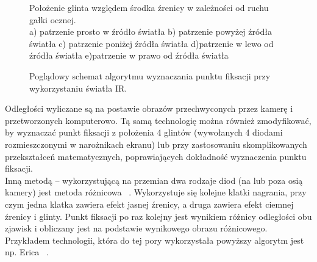 \documentclass[twoside,a4paper]{book}
\begin{document}
\begin{figure}[!h]
		\centering
		\caption{Położenie glinta względem środka źrenicy w zależności od ruchu gałki ocznej. \\
a) patrzenie prosto w źródło światła b) patrzenie powyżej źródła światła c) patrzenie poniżej źródła światła d)patrzenie w lewo od źródła światła e)patrzenie w prawo od źródła światła 
}
		\label{fig:glint}
	\end{figure}
	
\begin{figure}[!h]

		\centering		
		\caption{Poglądowy schemat algorytmu wyznaczania punktu fiksacji przy wykorzystaniu światła IR. }
		\label{fig:glintUML}
	\end{figure}
	
Odległości wyliczane są  na postawie obrazów przechwyconych  przez kamerę i przetworzonych komputerowo.  
Tą samą technologię można również zmodyfikować, by wyznaczać punkt fiksacji  z położenia 4 glintów (wywołanych 4 diodami rozmieszczonymi w narożnikach ekranu) lub przy zastosowaniu skomplikowanych  przekształceń matematycznych,  poprawiających dokładność  wyznaczenia punktu fiksacji. ~\cite{kunkaFiksacja}
\\Inną metodą – wykorzystującą  na przemian dwa rodzaje diod (na lub poza osią kamery) jest metoda różnicowa ~\cite{kunkaFiksacja}. Wykorzystuje się kolejne klatki nagrania, przy czym jedna klatka zawiera efekt jasnej źrenicy, a druga zawiera efekt ciemnej źrenicy i glinty. Punkt fiksacji po raz kolejny jest wynikiem różnicy odległości obu zjawisk i obliczany jest na podstawie wynikowego obrazu różnicowego.\\
Przykładem technologii, która do tej pory wykorzystała powyższy algorytm jest np. Erica ~\cite{erica}.
\end{document}
